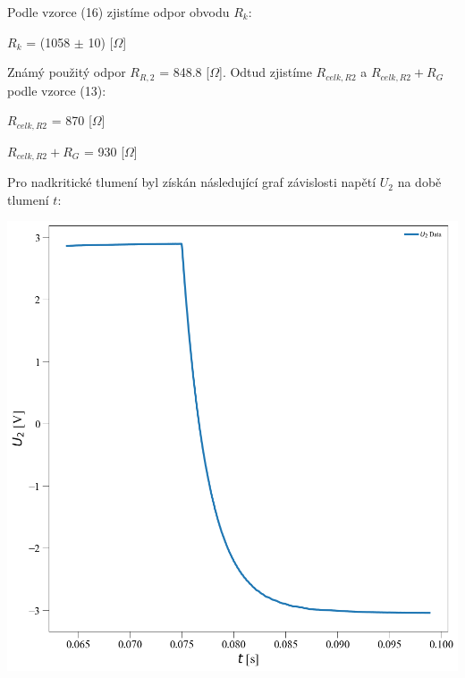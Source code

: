 \documentclass[a4paper,11pt]{article}
\begin{document}
\begin{minipage}[t]{0.5\textwidth}
                \captionsetup{justification=centering, font=footnotesize}
                \label{fig:krit}
                \raggedright
                \vspace{10pt}
                Podle vzorce (16) zjistíme odpor obvodu $R_k$: 
                \begin{center}
                    $R_k$ = (1058 $\pm$ 10) [$\Omega$]
                \end{center}
\end{minipage}
\hspace{10pt}
\begin{minipage}[t]{0.5\textwidth} 
                Známý použitý odpor $R_{R,2}$ = 848.8 [$\Omega$]. Odtud zjistíme $R_{celk, R2}$ a $R_{celk, R2} + R_G$ podle vzorce (13):
                \begin{center}
                    $R_{celk, R2}$ = 870 [$\Omega$]
                    \vspace{5pt}
                    \par $R_{celk, R2} + R_G$ = 930 [$\Omega$]
                \end{center}
                Pro nadkritické tlumení byl získán následující graf závislosti napětí $U_2$ na době tlumení $t$: 
                \par \centering
                \vspace{10pt}
                \includegraphics[scale=0.3]{nad_krit}

\end{minipage}
\end{document}
